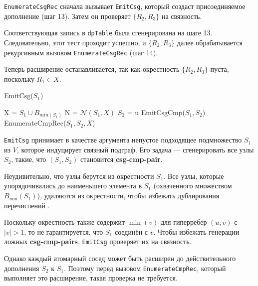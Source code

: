 \documentclass[12pt]{article}
\begin{document}
\begin{flushleft}
\texttt{EnumerateCsgRec} сначала вызывает \texttt{EmitCsg},  
который создаст присоединяемое дополнение (шаг 13).  
Затем он проверяет $\{R_2, R_3\}$ на связность.  

Соответствующая запись в \texttt{dpTable} была сгенерирована на шаге 13.  
Следовательно, этот тест проходит успешно,  
и $\{R_2, R_3\}$ далее обрабатывается рекурсивным вызовом  
\texttt{EnumerateCsgRec} (шаг 14).  

Теперь расширение останавливается, так как окрестность $\{R_2, R_3\}$ пуста,  
поскольку $R_1 \in X$.  

\begin{algorithm}
    EmitCsg($S_1$)
    \begin{algorithmic}[1]
        \State X = $S_1 \cup B_{min(S_1)}$
        \State N = $\mathcal{N}(S_1, X)$
            \State $S_2$ = {u}
                \State EmitCsgCmp($S_1, S_2$)
            \EndIf
            \State EnumerateCmpRec($S_1,S_2,X$)
        \EndFor
    \end{algorithmic}
\end{algorithm}

\texttt{EmitCsg} принимает в качестве аргумента непустое подходящее подмножество $S_1$ из $V$,  
которое индуцирует связный подграф.  
Его задача — сгенерировать все узлы $S_2$, такие,  
что $(S_1, S_2)$ становится \textbf{csg-cmp-pair}.  

Неудивительно, что узлы берутся из окрестности $S_1$.  
Все узлы, которые упорядочивались до наименьшего элемента в $S_1$  
(охваченного множеством $B_{\min}(S_1)$), удаляются из окрестности,  
чтобы избежать дублирования перечислений \cite{17}.  

Поскольку окрестность также содержит $\min(v)$  
для гиперрёбер $(u, v)$ с $|v| > 1$,  
то не гарантируется, что $S_1$ соединён с $v$.  
Чтобы избежать генерации ложных \textbf{csg-cmp-pairs},  
\texttt{EmitCsg} проверяет их на связность.  

Однако каждый атомарный сосед может быть расширен  
до действительного дополнения $S_2$ к $S_1$.  
Поэтому перед вызовом \texttt{EnumerateCmpRec},  
который выполняет это расширение, такая проверка не требуется.  

\begin{center}
\end{center}
\end{flushleft}
\end{document}
